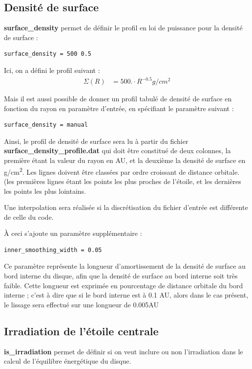 \subsection{Densité de surface}
\textbf{surface\_density} permet de définir le profil en loi de puissance pour la densité de surface : 
\begin{verbatim}
surface_density = 500 0.5
\end{verbatim}
Ici, on a défini le profil suivant : 
\begin{align*}
\Sigma(R) &= 500. \cdot R^{-0.5} \unit{g/cm^2}
\end{align*}

Mais il est aussi possible de donner un profil tabulé de densité de surface en fonction du rayon en paramètre d'entrée, en spécifiant le paramètre suivant : 
\begin{verbatim}
surface_density = manual
\end{verbatim}
Ainsi, le profil de densité de surface sera lu à partir du fichier \textbf{surface\_density\_profile.dat} qui doit être constitué de deux colonnes, la première étant la valeur du rayon en AU, et la deuxième la densité de surface en \unit{g/cm^2}. Les lignes doivent être classées par ordre croissant de distance orbitale. (les premières lignes étant les points les plus proches de l'étoile, et les dernières les points les plus lointains. 

\begin{remarque}
Une interpolation sera réalisée si la discrétisation du fichier d'entrée est différente de celle du code.
\end{remarque}

\bigskip

À ceci s'ajoute un paramètre supplémentaire : 
\begin{verbatim}
inner_smoothing_width = 0.05
\end{verbatim}

Ce paramètre représente la longueur d'amortissement de la densité de surface au bord interne du disque, afin que la densité de surface au bord interne soit très faible. Cette longueur est exprimée en pourcentage de distance orbitale du bord interne ; c'est à dire que si le bord interne est à 0.1 AU, alors dans le cas présent, le lissage sera effectué sur une longueur de 0.005AU

\subsection{Irradiation de l'étoile centrale}
\textbf{is\_irradiation} permet de définir si on veut inclure ou non l'irradiation dans le calcul de l'équilibre énergétique du disque. 

